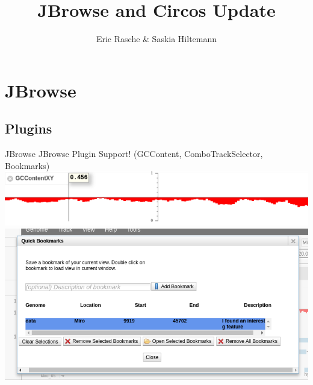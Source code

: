 \documentclass[12pt]{phage3slides} %
\title[JBrowse and Circos Update]{JBrowse and Circos Update}
\author[ER, SH]{Eric Rasche \& Saskia Hiltemann}
\begin{document}
\frame{\titlepage}


\section{JBrowse}
{
  \begin{frame}[plain]
  \end{frame}
}

\subsection{Plugins}
{
\begin{frame}{JBrowse}
	JBrowse Plugin Support! ({\color{gray}GCContent, ComboTrackSelector, Bookmarks})
	\includegraphics[width=\textwidth]{plugin-gc.png} \\
	\includegraphics[width=\textwidth]{plugin-book.png}
\end{frame}
}
\end{document}
